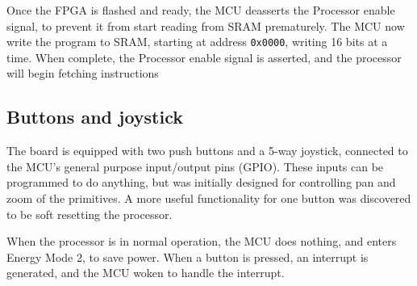 Once the FPGA is flashed and ready, the MCU deasserts the Processor enable signal, to prevent it from start reading from SRAM prematurely.
The MCU now write the program to SRAM, starting at address \texttt{0x0000}, writing 16 bits at a time.
When complete, the Processor enable signal is asserted, and the processor will begin fetching instructions

\subsection{Buttons and joystick}
The board is equipped with two push buttons and a 5-way joystick, connected to the MCU's general purpose input/output pins (GPIO).
These inputs can be programmed to do anything, but was initially designed for controlling pan and zoom of the primitives.
A more useful functionality for one button was discovered to be soft resetting the processor.

When the processor is in normal operation, the MCU does nothing, and enters Energy Mode 2, to save power.
When a button is pressed, an interrupt is generated, and the MCU woken to handle the interrupt.

